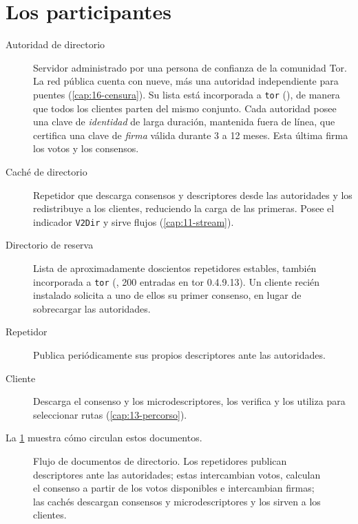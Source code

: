 \section{Los participantes}\label{sec:dir-attori}

\begin{description}
  \item[Autoridad de directorio] Servidor administrado por una persona de confianza de la comunidad Tor. La red pública cuenta con nueve, más una autoridad independiente para puentes (\cref{cap:16-censura}). Su lista está incorporada a \texttt{tor} (), de manera que todos los clientes parten del mismo conjunto. Cada autoridad posee una clave de \emph{identidad} de larga duración, mantenida fuera de línea, que certifica una clave de \emph{firma} válida durante 3 a 12 meses. Esta última firma los votos y los consensos.
  \item[Caché de directorio] Repetidor que descarga consensos y descriptores desde las autoridades y los redistribuye a los clientes, reduciendo la carga de las primeras. Posee el indicador \texttt{V2Dir} y sirve flujos  (\cref{cap:11-stream}).
  \item[Directorio de reserva] Lista de aproximadamente doscientos repetidores estables, también incorporada a \texttt{tor} (, 200 entradas en tor 0.4.9.13). Un cliente recién instalado solicita a uno de ellos su primer consenso, en lugar de sobrecargar las autoridades.
  \item[Repetidor] Publica periódicamente sus propios descriptores ante las autoridades.
  \item[Cliente] Descarga el consenso y los microdescriptores, los verifica y los utiliza para seleccionar rutas (\cref{cap:13-percorso}).
\end{description}

La \cref{fig:dir-flusso} muestra cómo circulan estos documentos.

\begin{figure}[htbp]
\centering

\caption{Flujo de documentos de directorio. Los repetidores publican descriptores ante las autoridades; estas intercambian votos, calculan el consenso a partir de los votos disponibles e intercambian firmas; las cachés descargan consensos y microdescriptores y los sirven a los clientes.}
\label{fig:dir-flusso}
\end{figure}

